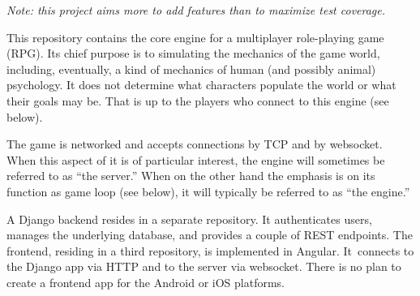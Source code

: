 {\em \small Note: this project aims more to add features than to maximize
test coverage.}

\bigskip

This repository contains the core engine for a multiplayer role-playing game
(RPG).
Its chief purpose is to simulating the mechanics of the game world, including,
eventually, a kind of mechanics of human (and possibly animal) psychology.
It does not determine what characters populate the world or what their goals
may be.
That is up to the players who connect to this engine (see below).

The game is networked and accepts connections by TCP and by websocket.
When this aspect of it is of particular interest, the engine will sometimes be
referred to as ``the server.''
When on the other hand the emphasis is on its function as game loop (see below),
it will typically be referred to as ``the engine.''

A Django backend resides in a separate repository.
It authenticates users, manages the underlying database, and provides a couple
of REST endpoints.
The frontend, residing in a third repository, is implemented in Angular.
It~connects to the Django app via HTTP and to the server via websocket.
There is no plan to create a frontend app for the Android or iOS platforms.